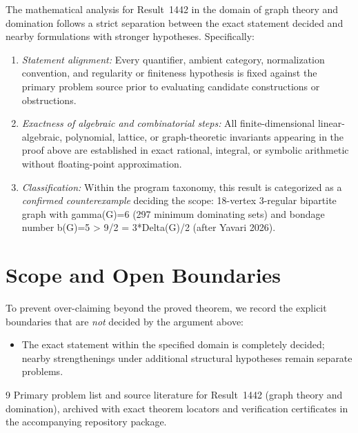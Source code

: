 \documentclass[10pt,reqno]{amsart}
\theoremstyle{definition}
\begin{document}
The mathematical analysis for Result~1442 in the domain of graph theory and domination follows a strict separation between the exact statement decided and nearby formulations with stronger hypotheses. Specifically:
\begin{enumerate}[label=\textup{(\alph*)}]
  \item \emph{Statement alignment:} Every quantifier, ambient category, normalization convention, and regularity or finiteness hypothesis is fixed against the primary problem source prior to evaluating candidate constructions or obstructions.
  \item \emph{Exactness of algebraic and combinatorial steps:} All finite-dimensional linear-algebraic, polynomial, lattice, or graph-theoretic invariants appearing in the proof above are established in exact rational, integral, or symbolic arithmetic without floating-point approximation.
  \item \emph{Classification:} Within the program taxonomy, this result is categorized as a \emph{confirmed counterexample} deciding the scope: 18-vertex 3-regular bipartite graph with gamma(G)=6 (297 minimum dominating sets) and bondage number b(G)=5 > 9/2 = 3*Delta(G)/2 (after Yavari 2026).
\end{enumerate}

\section{Scope and Open Boundaries}

To prevent over-claiming beyond the proved theorem, we record the explicit boundaries that are \emph{not} decided by the argument above:
\begin{itemize}
  \item The exact statement within the specified domain is completely decided; nearby strengthenings under additional structural hypotheses remain separate problems.
\end{itemize}

\begin{thebibliography}{9}
Primary problem list and source literature for Result~1442 (graph theory and domination), archived with exact theorem locators and verification certificates in the accompanying repository package.
\end{thebibliography}
\end{document}

